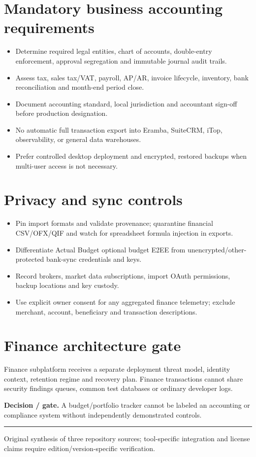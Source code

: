 \documentclass[10pt,letterpaper]{article}
\begin{document}
\section{Mandatory business accounting requirements}
\begin{itemize}
\item Determine required legal entities, chart of accounts, double-entry enforcement, approval segregation and immutable journal audit trails.
\item Assess tax, sales tax/VAT, payroll, AP/AR, invoice lifecycle, inventory, bank reconciliation and month-end period close.
\item Document accounting standard, local jurisdiction and accountant sign-off before production designation.
\item No automatic full transaction export into Eramba, SuiteCRM, iTop, observability, or general data warehouses.
\item Prefer controlled desktop deployment and encrypted, restored backups when multi-user access is not necessary.
\end{itemize}
\section{Privacy and sync controls}
\begin{itemize}
\item Pin import formats and validate provenance; quarantine financial CSV/OFX/QIF and watch for spreadsheet formula injection in exports.
\item Differentiate Actual Budget optional budget E2EE from unencrypted/other-protected bank-sync credentials and keys.
\item Record brokers, market data subscriptions, import OAuth permissions, backup locations and key custody.
\item Use explicit owner consent for any aggregated finance telemetry; exclude merchant, account, beneficiary and transaction descriptions.
\end{itemize}
\section{Finance architecture gate}
Finance subplatform receives a separate deployment threat model, identity context, retention regime and recovery plan. Finance transactions cannot share security findings queues, common test databases or ordinary developer logs.\par
\textbf{Decision / gate.} A budget/portfolio tracker cannot be labeled an accounting or compliance system without independently demonstrated controls.\par
\vfill\noindent\color{muted}\rule{\linewidth}{0.4pt}\par\scriptsize Original synthesis of three repository sources; tool-specific integration and license claims require edition/version-specific verification.\normalsize
\end{document}
